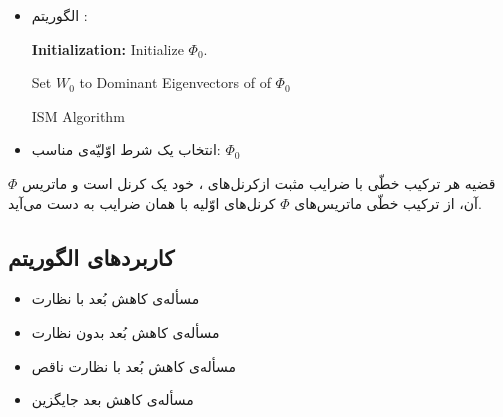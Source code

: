 \begin{rawslide}
	\begin{itemize}
		\item 
		الگوریتم
		\large{}\normalsize:
		\begin{latin}
			\begin{algorithm}[H]
				\SetAlgoLined
				\textbf{Initialization:} Initialize $\Phi_0$.
				
				Set $W_0$ to Dominant Eigenvectors of  of $\Phi_0$
				
				
				\caption{ISM Algorithm}
				\label{alg:ism}
			\end{algorithm}   
		\end{latin}
		\normalsize
		\item 
		انتخاب یک شرط اوّلیّه‌ی مناسب:
		$\Phi_0$
	\end{itemize}
	\pause
	\begin{block}{قضیه}
		هر ترکیب خطّی با ضرایب مثبت ازکرنل‌های
		\large{}\normalsize،
		خود یک کرنل 
			\large{}\normalsize
			است و ماتریس
			$\Phi$
			آن، از ترکیب خطّی ماتریس‌های
			$\Phi$
			کرنل‌های اوّلیه با همان ضرایب به دست می‌آید.
	\end{block}
\end{rawslide}
\begin{rawslide}
	\subsection{کاربردهای الگوریتم
	\Large{}\normalsize}
	\begin{itemize}
		\item 
		مسأله‌ی کاهش بُعد با نظارت
		\large{}\normalsize
		\item 
		مسأله‌ی کاهش بُعد بدون نظارت
		\large{}\normalsize
		\item 
		مسأله‌ی کاهش بُعد با نظارت ناقص
		\large{}\normalsize
		\item 
		مسأله‌ی کاهش بعد جایگزین
		\large{}
	\end{itemize}
\end{rawslide}
\begin{rawslide}
	
\end{rawslide}


